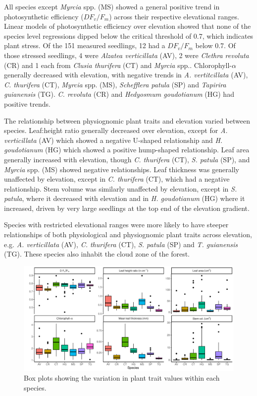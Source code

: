 \documentclass[a4paper, 11pt]{article}
\begin{document}
All species except \textit{Myrcia} spp. (MS) showed a general positive trend in photosynthetic efficiency ($D F_v/F_m$) across their respective elevational ranges. Linear models of photosynthetic efficiency over elevation showed that none of the species level regressions dipped below the critical threshold of 0.7, which indicates plant stress. Of the 151 measured seedlings, 12 had a $D F_v/F_m$ below 0.7. Of those stressed seedlings, 4 were \textit{Alzatea verticillata} (AV), 2 were  \textit{Clethra revoluta} (CR) and 1 each from \textit{Clusia thurifera} (CT) and \textit{Myrcia} spp.. Chlorophyll-$\alpha$ generally decreased with elevation, with negative trends in \textit{A. vertitcillata} (AV), \textit{C. thurifera} (CT), \textit{Myrcia} spp. (MS), \textit{Schefflera patula} (SP) and \textit{Tapirira guianensis} (TG). \textit{C. revoluta} (CR)  and \textit{Hedyosmum goudotianum} (HG) had positive trends. 

The relationship between physiognomic plant traits and elevation varied between species. Leaf:height ratio generally decreased over elevation, except for \textit{A. verticillata} (AV) which showed a negative U-shaped relationship and \textit{H. goudotianum} (HG) which showed a positive hump-shaped relationship. Leaf area generally increased with elevation, though \textit{C. thurifera} (CT), \textit{S. patula} (SP), and \textit{Myrcia} spp. (MS) showed negative relationships. Leaf thickness was generally unaffected by elevation, except in \textit{C. thurifera} (CT), which had a negative relationship. Stem volume was similarly unaffected by elevation, except in \textit{S. patula}, where it decreased with elevation and in \textit{H. goudotianum} (HG) where it increased, driven by very large seedlings at the top end of the elevation gradient. 

Species with restricted elevational ranges were more likely to have steeper relationships of both physiological and physiognomic plant traits across elevation, e.g. \textit{A. verticillata} (AV), \textit{C. thurifera} (CT), \textit{S. patula} (SP) and \textit{T. guianensis} (TG). These species also inhabit the cloud zone of the forest. 

\begin{figure}[H]
\includegraphics[width=\textwidth]{box}
\centering
\caption{Box plots showing the variation in plant trait values within each species.}
\label{fig:box}
\end{figure}
\end{document}
